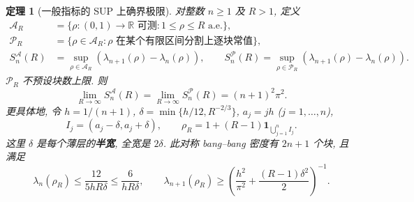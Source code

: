 \documentclass[UTF8]{ctexart}
\newtheorem{theorem}{定理}[section]
\begin{document}
\begin{theorem}[一般指标的 SUP 上确界极限]\label{thm:sup-limit}
对整数 $n\ge1$ 及 $R>1$, 定义
\begin{align*}
\mathcal A_R&=\{\rho:(0,1)\to\mathbb R\text{ 可测}:1\le\rho\le R\text{ a.e.}\},\\
\mathcal P_R&=\{\rho\in\mathcal A_R:\rho\text{ 在某个有限区间分割上逐块常值}\},\\
S_n^{\mathcal A}(R)&=\sup_{\rho\in\mathcal A_R}(\lambda_{n+1}(\rho)-\lambda_n(\rho)),\qquad
S_n^{\mathcal P}(R)=\sup_{\rho\in\mathcal P_R}(\lambda_{n+1}(\rho)-\lambda_n(\rho)).
\end{align*}
$\mathcal P_R$ 不预设块数上限. 则
\begin{equation}\label{eq:sup-limit}
\lim_{R\to\infty}S_n^{\mathcal A}(R)
=\lim_{R\to\infty}S_n^{\mathcal P}(R)=(n+1)^2\pi^2.
\end{equation}
更具体地, 令 $h=1/(n+1)$, $\delta=\min\{h/12,R^{-2/3}\}$,
$a_j=jh$ ($j=1,\dots,n$),
\begin{equation}\label{eq:thin-density}
I_j=(a_j-\delta,a_j+\delta),\qquad
\rho_R=1+(R-1)\mathbf1_{\bigcup_{j=1}^n I_j}.
\end{equation}
这里 $\delta$ 是每个薄层的\textbf{半宽}, 全宽是 $2\delta$.
此对称 bang--bang 密度有 $2n+1$ 个块, 且满足
\begin{equation}\label{eq:thin-bounds}
\lambda_n(\rho_R)\le\frac{12}{5hR\delta}\le\frac6{hR\delta},\qquad
\lambda_{n+1}(\rho_R)\ge
\left(\frac{h^2}{\pi^2}+\frac{(R-1)\delta^2}{2}\right)^{-1}.
\end{equation}
\end{theorem}
\end{document}
